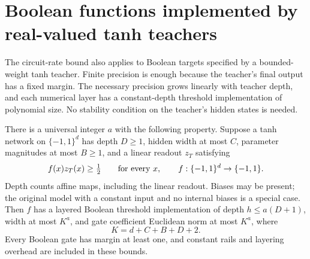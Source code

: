 \section{Boolean functions implemented by real-valued tanh teachers}
\label{sec:analog-teacher-critical-rate}

The circuit-rate bound also applies to Boolean targets specified by a
bounded-weight tanh teacher. Finite precision is enough because the
teacher's final output has a fixed margin. The necessary precision
grows linearly with teacher depth, and each numerical layer has a
constant-depth threshold implementation of polynomial size.
No stability condition on the teacher's hidden states is needed.

\begin{lemma}
\label{lem:analog-teacher-threshold-compilation}
There is a universal integer $a$ with the following property.
Suppose a tanh network on $\{-1,1\}^d$ has depth $D\ge1$, hidden
width at most $C$, parameter magnitudes at most $B\ge1$, and a linear
readout $z_T$ satisfying
\[
 f(x)z_T(x)\ge\tfrac12\qquad\hbox{for every }x,
 \qquad f:\{-1,1\}^d\to\{-1,1\}.
\]
Depth counts affine maps, including the linear readout. Biases may be
present; the original model with a constant input and no internal
biases is a special case.
Then $f$ has a layered Boolean threshold implementation of depth
$h\le a(D+1)$, width at most $K^a$, and gate coefficient Euclidean
norm at most $K^a$, where
\[
 K=d+C+B+D+2.
\]
Every Boolean gate has margin at least one, and constant rails and
layering overhead are included in these bounds.
\end{lemma}

